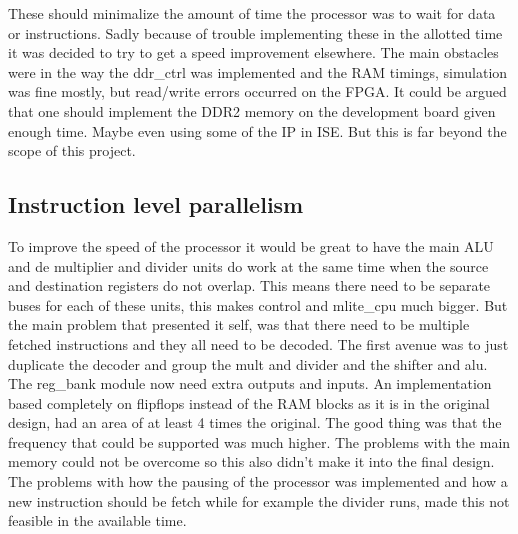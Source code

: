 \documentclass[final]{article}
\begin{document}
These should minimalize the amount of time the processor was to wait for data or instructions.
Sadly because of trouble implementing these in the allotted time it was decided to try to get a speed improvement elsewhere.
The main obstacles were in the way the ddr\_ctrl was implemented and the RAM timings, simulation was fine mostly, but read/write errors occurred on the FPGA.
It could be argued that one should implement the DDR2 memory on the development board given enough time.
Maybe even using some of the IP in ISE.
But this is far beyond the scope of this project.

\subsection{Instruction level parallelism}
To improve the speed of the processor it would be great to have the main ALU and de multiplier and divider units do work at the same time when the source and destination registers do not overlap.
This means there need to be separate buses for each of these units, this makes control and mlite\_cpu much bigger.
But the main problem that presented it self, was that there need to be multiple fetched instructions and they all need to be decoded.
The first avenue was to just duplicate the decoder and group the mult and divider and the shifter and alu.
The reg\_bank module now need extra outputs and inputs.
An implementation based completely on flipflops instead of the RAM blocks as it is in the original design, had an area of at least 4 times the original.
The good thing was that the frequency that could be supported was much higher.
The problems with the main memory could not be overcome so this also didn't make it into the final design.
The problems with how the pausing of the processor was implemented and how a new instruction should be fetch while for example the divider runs, made this not feasible in the available time.
\end{document}
